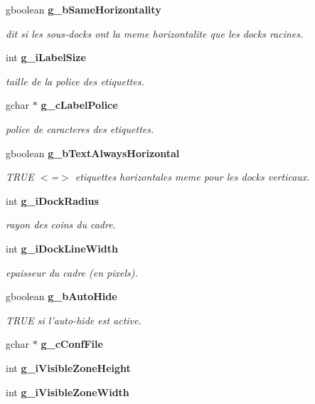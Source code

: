 \begin{CompactItemize}
gboolean {\bf g\_\-b\-Same\-Horizontality}
\begin{CompactList}\small\item\em dit si les sous-docks ont la meme horizontalite que les docks racines. \item\end{CompactList}\item 
int {\bf g\_\-i\-Label\-Size}
\begin{CompactList}\small\item\em taille de la police des etiquettes. \item\end{CompactList}\item 
gchar $\ast$ {\bf g\_\-c\-Label\-Police}
\begin{CompactList}\small\item\em police de caracteres des etiquettes. \item\end{CompactList}\item 
gboolean {\bf g\_\-b\-Text\-Always\-Horizontal}
\begin{CompactList}\small\item\em TRUE $<$=$>$ etiquettes horizontales meme pour les docks verticaux. \item\end{CompactList}\item 
int {\bf g\_\-i\-Dock\-Radius}
\begin{CompactList}\small\item\em rayon des coins du cadre. \item\end{CompactList}\item 
int {\bf g\_\-i\-Dock\-Line\-Width}
\begin{CompactList}\small\item\em epaisseur du cadre (en pixels). \item\end{CompactList}\item 
gboolean {\bf g\_\-b\-Auto\-Hide}
\begin{CompactList}\small\item\em TRUE si l'auto-hide est active. \item\end{CompactList}\item 
gchar $\ast$ {\bf g\_\-c\-Conf\-File}
\item 
int {\bf g\_\-i\-Visible\-Zone\-Height}
\item 
int {\bf g\_\-i\-Visible\-Zone\-Width}

\end{CompactItemize}

